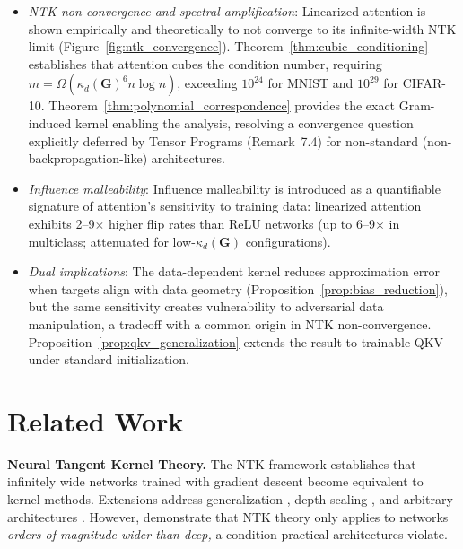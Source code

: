 \documentclass{article}
\theoremstyle{plain}
\theoremstyle{definition}
\theoremstyle{remark}
\begin{document}
\begin{itemize}
\item \emph{NTK non-convergence and spectral amplification}: Linearized attention is shown empirically and theoretically to not converge to its infinite-width NTK limit (Figure~\ref{fig:ntk_convergence}). Theorem~\ref{thm:cubic_conditioning} establishes that attention cubes the condition number, requiring $m = \Omega(\kappa_d(\mathbf{G})^6 n\log n)$, exceeding $10^{24}$ for MNIST and $10^{29}$ for CIFAR-10. Theorem~\ref{thm:polynomial_correspondence} provides the exact Gram-induced kernel enabling the analysis, resolving a convergence question explicitly deferred by Tensor Programs \citep{yang2020tensor} (Remark~7.4) for non-standard (non-backpropagation-like) architectures.

\item \emph{Influence malleability}: Influence malleability is introduced as a quantifiable signature of attention's sensitivity to training data: linearized attention exhibits 2--9$\times$ higher flip rates than ReLU networks (up to 6--9$\times$ in multiclass; attenuated for low-$\kappa_d(\mathbf{G})$ configurations).

\item \emph{Dual implications}: The data-dependent kernel reduces approximation error when targets align with data geometry (Proposition~\ref{prop:bias_reduction}), but the same sensitivity creates vulnerability to adversarial data manipulation, a tradeoff with a common origin in NTK non-convergence. Proposition~\ref{prop:qkv_generalization} extends the result to trainable QKV under standard initialization.
\end{itemize}

\section{Related Work}
\label{sec:related}

\textbf{Neural Tangent Kernel Theory.} The NTK framework \citep{jacot2018neural} establishes that infinitely wide networks trained with gradient descent become equivalent to kernel methods. Extensions address generalization \citep{arora2019exact}, depth scaling \citep{du2019gradient}, and arbitrary architectures \citep{yang2020tensor}. However, \citet{wenger2023disconnect} demonstrate that NTK theory only applies to networks \emph{orders of magnitude wider than deep,} a condition practical architectures violate.
\end{document}
